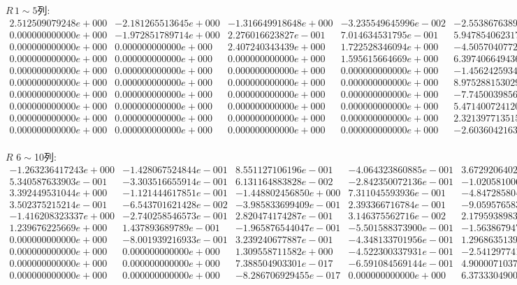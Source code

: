 \begin{landscape}
\newpage
$R\,1\sim 5$列:
\[
\begin{matrix}
2.512509079248e+000 & -2.181265513645e+000 & -1.316649918648e+000 & -3.235549645996e-002 & -2.553867638933e-001\\0.000000000000e+000 & -1.972851789714e+000 & 2.276016623827e-001 & 7.014634531795e-001 & 5.947854062317e-001\\0.000000000000e+000 & 0.000000000000e+000 & 2.407240343439e+000 & 1.722528346094e+000 & -4.505704077291e-001\\0.000000000000e+000 & 0.000000000000e+000 & 0.000000000000e+000 & 1.595615664669e+000 & 6.397406649436e-001\\0.000000000000e+000 & 0.000000000000e+000 & 0.000000000000e+000 & 0.000000000000e+000 & -1.456242593458e+000\\0.000000000000e+000 & 0.000000000000e+000 & 0.000000000000e+000 & 0.000000000000e+000 & 8.975288153029e-017\\0.000000000000e+000 & 0.000000000000e+000 & 0.000000000000e+000 & 0.000000000000e+000 & -7.745003985679e-018\\0.000000000000e+000 & 0.000000000000e+000 & 0.000000000000e+000 & 0.000000000000e+000 & 5.471400724120e-017\\0.000000000000e+000 & 0.000000000000e+000 & 0.000000000000e+000 & 0.000000000000e+000 & 2.321397713515e-017\\0.000000000000e+000 & 0.000000000000e+000 & 0.000000000000e+000 & 0.000000000000e+000 & -2.603604216329e-017\\
\end{matrix}\]

$R$
$6\sim$10列:
\[
\begin{matrix}
-1.263236417243e+000 & -1.428067524844e-001 & 8.551127106196e-001 & -4.064323860885e-001 & 3.672920640297e-001\\5.340587633903e-001 & -3.303516655914e-001 & 6.131164883828e-002 & -2.842350072136e-001 & -1.020581006877e-001\\3.392449531044e+000 & -1.121444617851e-001 & -1.448802456850e+000 & 7.311045593936e-001 & -4.847285804893e-001\\3.502375215214e-001 & -6.543701621428e-002 & -3.985833699409e-001 & 2.393366716784e-001 & -9.059576583919e-002\\-1.416208323337e+000 & -2.740258546573e-001 & 2.820474174287e-001 & 3.146375562716e-002 & 2.179593898341e-001\\1.239676225669e+000 & 1.437893689789e-001 & -1.965876544047e-001 & -5.501588373900e-001 & -1.563867947060e-001\\0.000000000000e+000 & -8.001939216933e-001 & 3.239240677887e-001 & -4.348133701956e-001 & 1.296863513999e-001\\0.000000000000e+000 & 0.000000000000e+000 & 1.309558711582e+000 & -4.522300337931e-001 & -2.541297741346e-001\\0.000000000000e+000 & 0.000000000000e+000 & 7.388504903301e-017 & -6.591084569144e-001 & 4.900007103780e-001\\0.000000000000e+000 & 0.000000000000e+000 & -8.286706929455e-017 & 0.000000000000e+000 & 6.373330490059e-002\\
\end{matrix}\]


\end{landscape}
